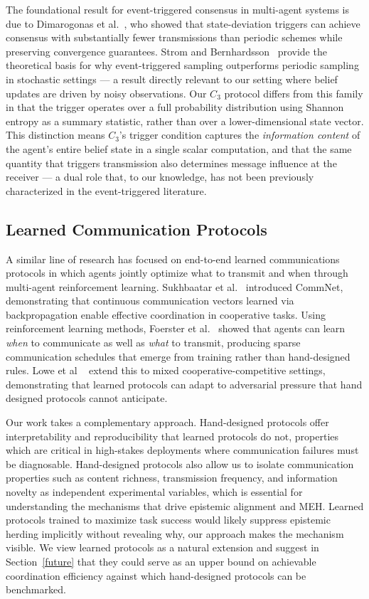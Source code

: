 \documentclass[pdflatex,sn-mathphys-num]{sn-jnl}%
\theoremstyle{thmstyleone}%
\theoremstyle{thmstyletwo}%
\theoremstyle{thmstylethree}%
\begin{document}
The foundational result for event-triggered consensus in multi-agent 
systems is due to Dimarogonas et al.~\cite{dimarogonas2011distributed}, who 
showed that state-deviation triggers can achieve consensus with 
substantially fewer transmissions than periodic schemes while 
preserving convergence guarantees. Strom and 
Bernhardsson~\cite{astrom2002comparison} provide the theoretical basis for 
why event-triggered sampling outperforms periodic sampling in 
stochastic settings --- a result directly relevant to our setting 
where belief updates are driven by noisy observations. Our $C_3$ 
protocol differs from this family in that the trigger operates 
over a full probability distribution using Shannon entropy as a 
summary statistic, rather than over a lower-dimensional state 
vector. This distinction means $C_3$'s trigger condition captures 
the \textit{information content} of the agent's entire belief 
state in a single scalar computation, and that the same quantity 
that triggers transmission also determines message influence at 
the receiver --- a dual role that, to our knowledge, has not been 
previously characterized in the event-triggered literature.

\subsection{Learned Communication Protocols}

A similar line of research has focused on end-to-end learned communications protocols in which agents jointly optimize what to transmit and when through multi-agent reinforcement learning. Sukhbaatar et al.~\cite{sukhbaatar2016learning} introduced CommNet, demonstrating that continuous communication vectors learned via backpropagation enable effective coordination in cooperative tasks. Using reinforcement learning methods, Foerster et al.~\cite{foerster2016learning} showed that agents can learn \textit{when} to communicate as well as \textit{what} to transmit, producing sparse communication schedules that emerge from training rather than hand-designed rules. Lowe et al ~\cite{lowe2017multi} extend this to mixed cooperative-competitive settings, demonstrating that learned protocols can adapt to adversarial pressure that hand designed protocols cannot anticipate.

Our work takes a complementary approach. Hand-designed protocols offer interpretability and reproducibility that learned protocols do not, properties which are critical in high-stakes deployments where communication failures must be diagnosable. Hand-designed protocols also allow us to isolate communication properties such as content richness, transmission frequency, and information novelty as independent experimental variables, which is essential for understanding the mechanisms that drive epistemic alignment and MEH. Learned protocols trained to maximize task success would likely suppress epistemic herding implicitly without revealing why, our approach makes the mechanism visible. We view learned protocols as a natural extension and suggest in Section~\ref{future} that they could serve as an upper bound on achievable coordination efficiency against which hand-designed protocols can be benchmarked.
\end{document}
